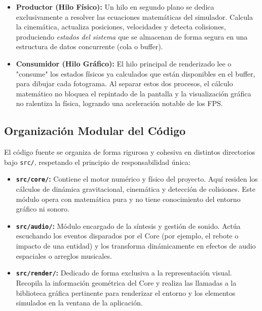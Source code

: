 \documentclass[12pt]{article}
\begin{document}
\begin{itemize}
    \item \textbf{Productor (Hilo Físico):} Un hilo en segundo plano se dedica exclusivamente a resolver las ecuaciones matemáticas del simulador. Calcula la cinemática, actualiza posiciones, velocidades y detecta colisiones, produciendo \textit{estados del sistema} que se almacenan de forma segura en una estructura de datos concurrente (cola o buffer).
    \item \textbf{Consumidor (Hilo Gráfico):} El hilo principal de renderizado lee o "consume" los estados físicos ya calculados que están disponibles en el buffer, para dibujar cada fotograma. Al separar estos dos procesos, el cálculo matemático no bloquea el repintado de la pantalla y la visualización gráfica no ralentiza la física, logrando una aceleración notable de los FPS.
\end{itemize}

\subsection{Organización Modular del Código}
El código fuente se organiza de forma rigurosa y cohesiva en distintos directorios bajo \texttt{src/}, respetando el principio de responsabilidad única:

\begin{itemize}
    \item \textbf{\texttt{src/core/}:} Contiene el motor numérico y físico del proyecto. Aquí residen los cálculos de dinámica gravitacional, cinemática y detección de colisiones. Este módulo opera con matemática pura y no tiene conocimiento del entorno gráfico ni sonoro.
    \item \textbf{\texttt{src/audio/}:} Módulo encargado de la síntesis y gestión de sonido. Actúa escuchando los eventos disparados por el Core (por ejemplo, el rebote o impacto de una entidad) y los transforma dinámicamente en efectos de audio espaciales o arreglos musicales.
    \item \textbf{\texttt{src/render/}:} Dedicado de forma exclusiva a la representación visual. Recopila la información geométrica del Core y realiza las llamadas a la biblioteca gráfica pertinente para renderizar el entorno y los elementos simulados en la ventana de la aplicación.
\end{itemize}
\end{document}

